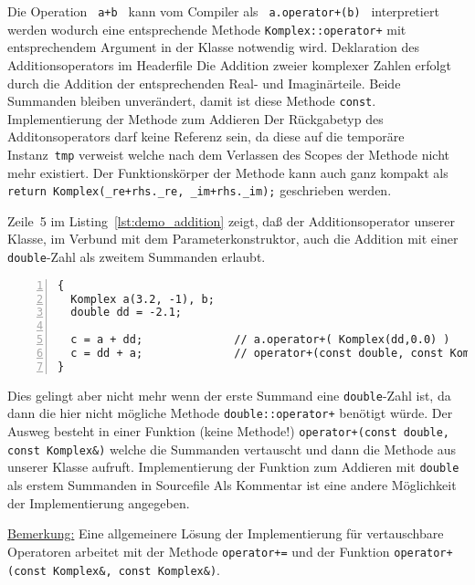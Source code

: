 Die Operation \verb| a+b |  kann vom Compiler als \verb| a.operator+(b) | interpretiert werden
wodurch eine entsprechende Methode \verb|Komplex::operator+| mit entsprechendem Argument
in der Klasse notwendig wird.
%
{Deklaration des Additionsoperators im Headerfile}
%
Die Addition zweier komplexer Zahlen  erfolgt durch die Addition der entsprechenden
Real- und Imaginärteile.
Beide Summanden bleiben unverändert, damit ist diese Methode \texttt{const}.
%
{Implementierung der Methode zum Addieren}
%
Der Rückgabetyp des Additonsoperators darf keine Referenz sein,
da diese auf die temporäre Instanz~\texttt{tmp} verweist welche
nach dem Verlassen des Scopes der Methode nicht mehr existiert.
Der Funktionskörper der Methode kann auch ganz kompakt als
\verb|return Komplex(_re+rhs._re, _im+rhs._im);| geschrieben werden.

Zeile~5 im Listing~\ref{lst:demo_addition} zeigt, daß der Additionsoperator unserer Klasse, im Verbund
mit dem Parameterkonstruktor, auch die Addition mit einer \texttt{double}-Zahl als
zweitem Summanden erlaubt.
\begin{lstlisting}[caption={Additionsoperator erweitert},label=lst:demo_addition,
basicstyle=\scriptsize,numbers=left, numberstyle=\tiny, stepnumber=2, numbersep=5pt]
{
  Komplex a(3.2, -1), b;
  double dd = -2.1;

  c = a + dd;              // a.operator+( Komplex(dd,0.0) )
  c = dd + a;              // operator+(const double, const Komplex&)
}
\end{lstlisting}
%
Dies gelingt aber nicht mehr wenn der erste Summand eine \texttt{double}-Zahl ist, da
dann die hier nicht mögliche  Methode \verb|double::operator+| benötigt würde.
Der Ausweg besteht in einer Funktion (keine Methode!)
\verb|operator+(const double, const Komplex&)| welche die Summanden vertauscht und dann
die Methode aus unserer Klasse aufruft.
%
{Implementierung der Funktion zum Addieren mit \texttt{double}
 als erstem Summanden in Sourcefile}
%
Als Kommentar ist eine andere Möglichkeit der Implementierung angegeben.

\underline{Bemerkung:} Eine allgemeinere Lösung der Implementierung für vertauschbare
Operatoren arbeitet mit der Methode \verb|operator+=|
und der Funktion \verb|operator+(const Komplex&, const Komplex&)|.
%
%
%
